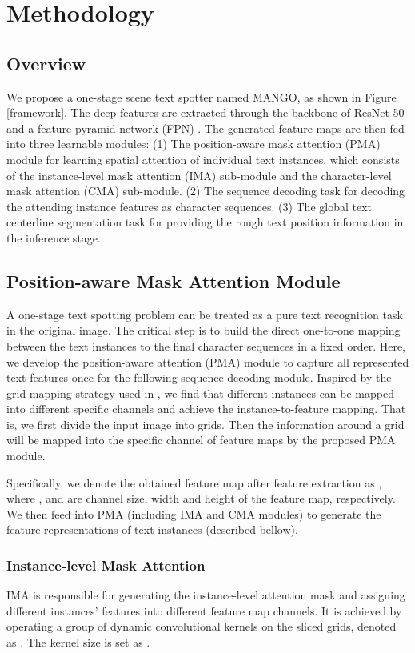 \documentclass[letterpaper]{article} \usepackage{aaai21}  \usepackage{times}  \usepackage{helvet} \usepackage{courier}  \usepackage[hyphens]{url}  \usepackage{graphicx} \urlstyle{rm} \def\UrlFont{\rm}  \usepackage{natbib}  \usepackage{caption} \frenchspacing  \setlength{\pdfpagewidth}{8.5in}  \setlength{\pdfpageheight}{11in}  \usepackage{multirow}
\begin{document}
\section{Methodology}
\subsection{Overview}
We propose a one-stage scene text spotter named MANGO, as shown in Figure \ref{framework}.
The deep features are extracted through the backbone of ResNet-50 \cite{he2016deep} and a feature pyramid network (FPN) \cite{lin2017feature}.
The generated feature maps are then fed into three learnable modules:
(1) The position-aware mask attention (PMA) module for learning spatial attention of individual text instances, which consists of the instance-level mask attention (IMA) sub-module and the character-level mask attention (CMA) sub-module.
(2) The sequence decoding task for decoding the attending instance features as character sequences.
(3) The global text centerline segmentation task for providing the rough text position information in the inference stage.
\subsection{Position-aware Mask Attention Module}

A one-stage text spotting problem can be treated as a pure text recognition task in the original image. The critical step is to build the direct one-to-one mapping between the text instances to the final character sequences in a fixed order.
Here, we develop the position-aware attention (PMA) module to capture all represented text features once for the following sequence decoding module.
Inspired by the grid mapping strategy used in \cite{wang2019solo}, we find that different instances can be mapped into different specific channels and achieve the instance-to-feature mapping.
That is, we first divide the input image into  grids. Then the information around a grid will be mapped into the specific channel of feature maps by the proposed PMA module.

Specifically,
we denote the obtained feature map after feature extraction as , where ,  and  are channel size, width and height of the feature map, respectively.
We then feed  into PMA (including IMA and CMA modules) to generate the feature representations of text instances (described bellow).

\subsubsection{Instance-level Mask Attention}
IMA is responsible for generating the instance-level attention mask and assigning different instances' features into different feature map channels. It is achieved by operating a group of dynamic convolutional kernels \cite{wang2020solov2} on the sliced grids, denoted as . The kernel size is set as .
\end{document}
